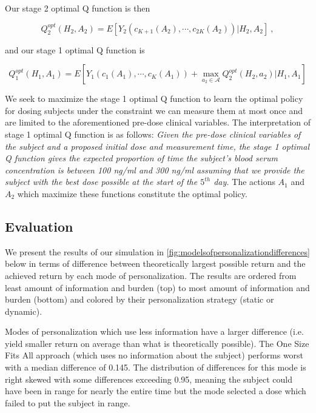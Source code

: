 Our stage 2 optimal Q function is then

\begin{equation}
Q_{2}^{o p t}\left(H_{2}, A_{2}\right)=E\left[Y_2\left(c_{K+1}(A_2), \cdots, c_{2K}(A_2)\right) \Bigg\vert H_{2}, A_{2}\right] \>,
\end{equation}

\noindent and our stage 1 optimal Q function is

\begin{equation}
Q_{1}^{o p t}\left(H_{1}, A_{1}\right)= E \left[Y_1\left(c_{1}(A_1),  \cdots, c_{K}(A_1)\right)+\max _{a_{2} \in \mathscr{A}} Q_{2}^{o p t}\left(H_{2}, a_{2}\right) \Bigg\vert H_{1}, A_{1}\right]
\end{equation}

We seek to maximize the stage 1 optimal Q function to learn the optimal policy for dosing subjects under the constraint we can measure them at most once and are limited to the aforementioned pre-dose clinical variables.  The interpretation of stage 1 optimal Q function is as follows:\textit{ Given the pre-dose clinical variables of the subject and a proposed initial dose and measurement time, the stage 1 optimal Q function gives the expected proportion of time the subject’s blood serum concentration is between 100 ng/ml and 300 ng/ml assuming that we provide the subject with the best dose possible at the start of the $ 5^{th} $ day.}  The actions $ A_1 $ and $ A_2 $ which maximize these functions constitute the optimal policy.


%


\subsection{Evaluation}

We present the results of our simulation in \cref{fig:modelsofpersonalizationdifferences} below in terms of difference between theoretically largest possible return and the achieved return by each mode of personalization.  The results are ordered from least amount of information and burden (top) to most amount of information and burden (bottom) and colored by their personalization strategy (static or dynamic).

Modes of personalization which use less information have a larger difference (i.e. yield smaller return on average than what is theoretically possible).  The One Size Fits All approach (which uses no information about the subject) performs worst with a median difference of 0.145.  The distribution of differences for this mode is right skewed with some differences exceeding 0.95, meaning the subject could have been in range for nearly the entire time but the mode selected a dose which failed to put the subject in range. 

